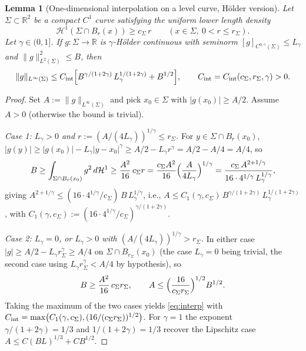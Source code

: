 \documentclass[11pt]{amsart}
\newtheorem{lemma}[theorem]{Lemma}
\newcommand{\R}{\mathbb R}
\newcommand{\HH}{\mathcal H}
\begin{document}
\begin{lemma}[One-dimensional interpolation on a level curve, Hölder
version]\label{lem:interp}
Let \(\Sigma\subset\R^2\) be a compact \(C^1\) curve satisfying the
uniform lower length density
\begin{equation}\label{eq:density}
   \HH^1(\Sigma\cap B_r(x))\ge c_\Sigma\,r
   \qquad(x\in\Sigma,\ 0<r\le r_\Sigma).
\end{equation}
Let \(\gamma\in(0,1]\).  If \(g:\Sigma\to\R\) is $\gamma$-Hölder
continuous with seminorm
\([g]_{C^{0,\gamma}(\Sigma)}\le L_\gamma\) and
\(\|g\|_{L^2(\Sigma)}^2\le B\), then
\begin{equation}\label{eq:interp}
   \|g\|_{L^\infty(\Sigma)}
      \le
   C_{\rm int}\Bigl[B^{\gamma/(1+2\gamma)}\,L_\gamma^{1/(1+2\gamma)}
      +B^{1/2}\Bigr],
   \qquad
   C_{\rm int}=C_{\rm int}(c_\Sigma,r_\Sigma,\gamma)>0.
\end{equation}
\end{lemma}

\begin{proof}
Set \(A:=\|g\|_{L^\infty(\Sigma)}\) and pick \(x_0\in\Sigma\) with
\(|g(x_0)|\ge A/2\).  Assume \(A>0\) (otherwise the bound is trivial).

\emph{Case 1: $L_\gamma>0$ and $r:=(A/(4L_\gamma))^{1/\gamma}\le
r_\Sigma$.}
For $y\in\Sigma\cap B_r(x_0)$,
$|g(y)|\ge|g(x_0)|-L_\gamma|y-x_0|^\gamma\ge A/2-L_\gamma r^\gamma
=A/2-A/4=A/4$, so
\[
   B\ge\int_{\Sigma\cap B_r(x_0)}g^2\,d\HH^1
      \ge\frac{A^2}{16}\,c_\Sigma r
      =\frac{c_\Sigma A^2}{16}\Bigl(\frac{A}{4L_\gamma}\Bigr)^{1/\gamma}
      =\frac{c_\Sigma\,A^{2+1/\gamma}}{16\cdot 4^{1/\gamma}\,L_\gamma^{1/\gamma}},
\]
giving $A^{2+1/\gamma}\le(16\cdot 4^{1/\gamma}/c_\Sigma)\,B\,
L_\gamma^{1/\gamma}$, i.e.,
$A\le C_1(\gamma,c_\Sigma)\,B^{\gamma/(1+2\gamma)}\,
L_\gamma^{1/(1+2\gamma)}$, with
$C_1(\gamma,c_\Sigma):=(16\cdot 4^{1/\gamma}/c_\Sigma)^{\gamma/(1+2\gamma)}$.

\emph{Case 2: $L_\gamma=0$, or $L_\gamma>0$ with $(A/(4L_\gamma))^{1/
\gamma}>r_\Sigma$.}
In either case $|g|\ge A/2-L_\gamma r_\Sigma^\gamma\ge A/4$ on
$\Sigma\cap B_{r_\Sigma}(x_0)$ (the case $L_\gamma=0$ being trivial,
the second case using $L_\gamma r_\Sigma^\gamma<A/4$ by hypothesis),
so
\[
   B\ge\frac{A^2}{16}\,c_\Sigma r_\Sigma,
   \qquad
   A\le\Bigl(\frac{16}{c_\Sigma r_\Sigma}\Bigr)^{1/2}B^{1/2}.
\]
Taking the maximum of the two cases yields \eqref{eq:interp} with
\(C_{\rm int}=\max\bigl(C_1(\gamma,c_\Sigma),(16/(c_\Sigma r_\Sigma))^{1/2}
\bigr)\).  For $\gamma=1$ the exponent $\gamma/(1+2\gamma)=1/3$ and
$1/(1+2\gamma)=1/3$ recover the Lipschitz case
$A\le C(BL)^{1/3}+CB^{1/2}$.
\end{proof}
\end{document}
